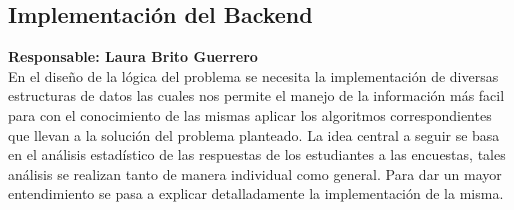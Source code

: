 \documentclass{book}
\begin{document}
		\subsection{Implementaci\'on del Backend}
			\textbf{Responsable: Laura Brito Guerrero} \\
			En el dise\~no de la l\'ogica del problema se necesita la implementaci\'on de diversas estructuras de datos las cuales nos permite el manejo de la informaci\'on m\'as facil para con el conocimiento de las mismas aplicar los algoritmos correspondientes que llevan a la soluci\'on del problema planteado. 
			La idea central a seguir se basa en el an\'alisis estad\'istico de las respuestas de los estudiantes a las encuestas, tales an\'alisis se realizan tanto de manera individual como general. Para dar un mayor entendimiento se pasa a explicar detalladamente la implementaci\'on de la misma.
\end{document}
